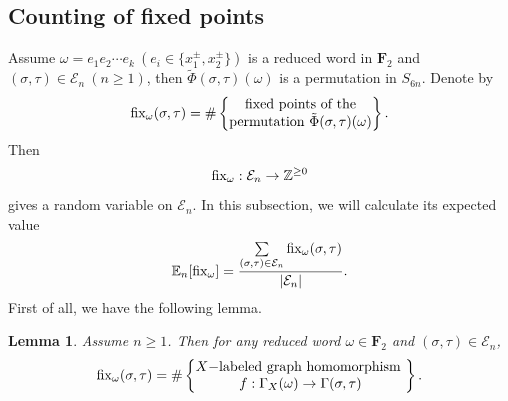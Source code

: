 \documentclass{amsart}
\theoremstyle{plain}
\newtheorem{lemma}[theorem]{Lemma}
\theoremstyle{definition}
\theoremstyle{remark}
\begin{document}
 \subsection{Counting of fixed points}
Assume $\omega=e_1e_2\cdots e_k\ (e_i\in\{x_1^{\pm},x_2^{\pm}\})$ is a reduced word in $\textbf{F}_2$ and $(\sigma,\tau)\in\mathcal{E}_n\ (n\geq 1)$, then $\tilde{\Phi}(\sigma,\tau)(\omega)$ is a permutation in $S_{6n}$. Denote by
$$\textnormal{fix}_\omega(\sigma,\tau)=\#\left\{\begin{matrix}\text{fixed points of the}\\ \text{permutation }\tilde{\Phi}(\sigma,\tau)(\omega)\end{matrix}\right\}.$$
Then  $$\textnormal{fix}_\omega:\mathcal{E}_n\to\mathbb{Z}^{\geq 0}$$ 
gives a random variable on $\mathcal{E}_n$. In this subsection, we will calculate its expected value $$\mathbb{E}_n[\textnormal{fix}_\omega]=\frac{\sum\limits_{(\sigma,\tau)\in\mathcal{E}_n}\textnormal{fix}_\omega(\sigma,\tau)}{|\mathcal{E}_n|}.$$
First of all, we have the following lemma.
  \begin{lemma}\label{l-equal}
  Assume $n\geq 1$. Then for any reduced word $\omega\in\textbf{F}_2$ and $(\sigma,\tau)\in\mathcal{E}_n$,
  \begin{align*}
     \textnormal{fix}_\omega(\sigma,\tau) =\#\left\{\begin{matrix}\text{$X-$labeled graph homomorphism }\\ f:\Gamma_X(\omega)\to\Gamma(\sigma,\tau)\end{matrix}\right\}.
  \end{align*}
  \end{lemma}
\end{document}
